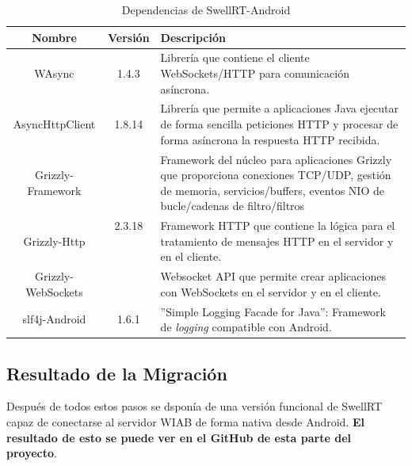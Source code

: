     \begin{table}[h]
      \footnotesize
      \begin{center}
	\begin{tabular}{ | c | c | m{8cm} | }
	  \hline
	  \textbf{Nombre} & \textbf{Versión} & \textbf{Descripción} \\
	  \hline
	  WAsync \cite{ref:wAsync_github} & 1.4.3 & Librería que contiene el cliente WebSockets/HTTP para comunicación asíncrona. \\ 
	  \hline
	  AsyncHttpClient \cite{ref:asyncHttpClient} & 1.8.14 & Librería que permite a aplicaciones Java ejecutar de forma sencilla peticiones HTTP y procesar de forma asíncrona la respuesta HTTP recibida. \\ 
	  \hline
	  Grizzly-Framework \cite{ref:grizzly} & \multirow{3}{*}{2.3.18} & Framework del núcleo para aplicaciones Grizzly que proporciona conexiones TCP/UDP, gestión de memoria, servicios/buffers, eventos NIO de bucle/cadenas de filtro/filtros \\ \cline{1-1} \cline{3-3} 
	  Grizzly-Http \cite{ref:grizzly} & & Framework HTTP que contiene la lógica para el tratamiento de mensajes HTTP en el servidor y en el cliente. \\ 
	  \cline{1-1} \cline{3-3} 
	  Grizzly-WebSockets \cite{ref:grizzly} & & Websocket API que permite crear aplicaciones con WebSockets en el servidor y en el cliente. \\ 
	  \hline
	  slf4j-Android \cite{ref:slf4j_android} & 1.6.1 & ''Simple Logging Facade for Java'': Framework de \textit{logging} compatible con Android. \\ 
	  \hline
	\end{tabular}
      \end{center}
      \caption{Dependencias de SwellRT-Android}
      \label{fig:dependencies_swellRT}
    \end{table}       
       
    \subsection{Resultado de la Migración} \label{ssec:migrationResult}
    
    Después de todos estos pasos se dsponía de una versión funcional de SwellRT capaz de conectarse al servidor WIAB de forma nativa desde Android. \textbf{El resultado de esto se puede ver en el GitHub de esta parte del proyecto}\cite{ref:wave_migration_github}.
    
